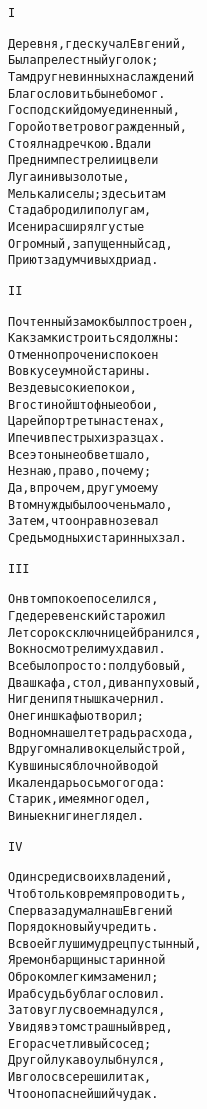 \begin{minipage}[t]{\dimexpr 0.5\textwidth -\tabcolsep-.5pt}
\begin{alltt}\normalfont\centering
I

Деревня, где скучал Евгений,
Была прелестный уголок;
Там друг невинных наслаждений
Благословить бы небо мог.
Господский дом уединенный,
Горой от ветров огражденный,
Стоял над речкою. Вдали
Пред ним пестрели и цвели
Луга и нивы золотые,
Мелькали селы; здесь и там
Стада бродили по лугам,
И сени расширял густые
Огромный, запущенный сад,
Приют задумчивых дриад.
\end{alltt}
\end{minipage}

\begin{minipage}[t]{\dimexpr 0.5\textwidth -\tabcolsep-.5pt}
\begin{alltt}\normalfont\centering
II

Почтенный замок был построен,
Как замки строиться должны:
Отменно прочен и спокоен
Во вкусе умной старины.
Везде высокие покои,
В гостиной штофные обои,
Царей портреты на стенах,
И печи в пестрых изразцах.
Все это ныне обветшало,
Не знаю, право, почему;
Да, впрочем, другу моему
В том нужды было очень мало,
Затем, что он равно зевал
Средь модных и старинных зал.
\end{alltt}
\end{minipage}
\clearpage

\begin{minipage}[t]{\dimexpr 0.5\textwidth -\tabcolsep-.5pt}
\begin{alltt}\normalfont\centering
III

Он в том покое поселился,
Где деревенский старожил
Лет сорок с ключницей бранился,
В окно смотрел и мух давил.
Все было просто: пол дубовый,
Два шкафа, стол, диван пуховый,
Нигде ни пятнышка чернил.
Онегин шкафы отворил;
В одном нашел тетрадь расхода,
В другом наливок целый строй,
Кувшины с яблочной водой
И календарь осьмого года:
Старик, имея много дел,
В иные книги не глядел.
\end{alltt}
\end{minipage}

\begin{minipage}[t]{\dimexpr 0.5\textwidth -\tabcolsep-.5pt}
\begin{alltt}\normalfont\centering
IV

Один среди своих владений,
Чтоб только время проводить,
Сперва задумал наш Евгений
Порядок новый учредить.
В своей глуши мудрец пустынный,
Ярем он барщины старинной
Оброком легким заменил;
И раб судьбу благословил.
Зато в углу своем надулся,
Увидя в этом страшный вред,
Его расчетливый сосед;
Другой лукаво улыбнулся,
И в голос все решили так,
Что он опаснейший чудак.
\end{alltt}
\end{minipage}
\clearpage

